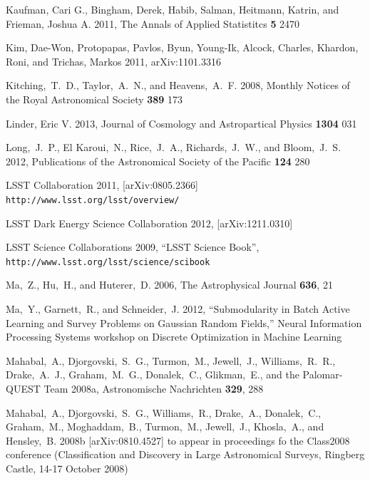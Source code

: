\documentclass[useAMS,usenatbib,tightenlines,11pt,preprint]{aastex}
\begin{document}
\begin{thebibliography}{99}
Kaufman, Cari G., Bingham, Derek, Habib, Salman, Heitmann, Katrin, and Frieman,
Joshua A. 2011, The Annals of Applied Statistitcs {\bf 5} 2470

Kim, Dae-Won, Protopapas, Pavlos, Byun, Young-Ik, Alcock, Charles, Khardon,
Roni, and Trichas, Markos 2011, arXiv:1101.3316

Kitching,~T.~D., Taylor,~A.~N., and Heavens,~A.~F. 2008,
Monthly Notices of the Royal Astronomical Society {\bf 389} 173

Linder, Eric V. 2013, Journal of Cosmology and Astropartical Physics {\bf 1304}
031

Long,~J.~P., El Karoui,~N., Rice,~J.~A., Richards,~J.~W., and Bloom,~J.~S. 2012,
Publications of the Astronomical Society of the Pacific {\bf 124} 280

LSST Collaboration 2011, [arXiv:0805.2366]
\verb|http://www.lsst.org/lsst/overview/|

LSST Dark Energy Science Collaboration 2012, [arXiv:1211.0310]

LSST Science Collaborations 2009, ``LSST Science Book'',
\verb|http://www.lsst.org/lsst/science/scibook|

Ma,~Z., Hu,~H., and Huterer,~D. 2006, The Astrophysical Journal {\bf 636}, 21

Ma,~Y., Garnett,~R., and Schneider,~J. 2012,
``Submodularity in Batch Active Learning and Survey Problems
on Gaussian Random Fields,''
Neural Information Processing Systems 
workshop on Discrete Optimization in Machine Learning

Mahabal,~A., Djorgovski,~S.~G., Turmon,~M., Jewell,~J., Williams,~R.~R.,
Drake,~A.~J., Graham,~M.~G., Donalek,~C., Glikman,~E., and the Palomar-QUEST Team
2008a, Astronomische Nachrichten {\bf 329}, 288

Mahabal,~A., Djorgovski,~S.~G., Williams,~R., Drake,~A., Donalek,~C.,
Graham,~M., Moghaddam,~B., Turmon,~M., Jewell,~J., Khosla,~A., and
Hensley,~B. 2008b [arXiv:0810.4527] to appear in proceedings fo the Class2008
conference (Classification and Discovery in Large Astronomical Surveys, Ringberg
Castle, 14-17 October 2008)


\end{thebibliography}
\end{document}
